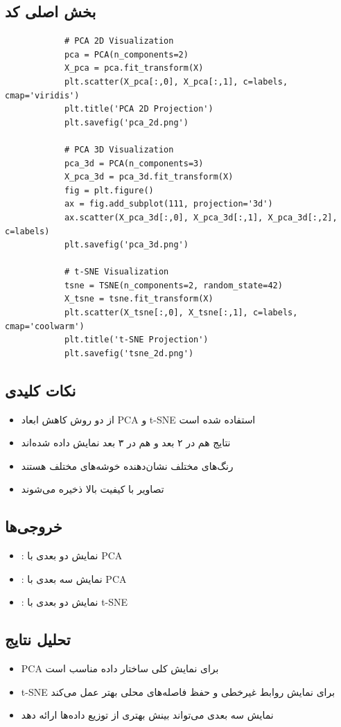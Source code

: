 \documentclass[a4paper,12pt]{article}
\begin{document}
	\subsection{بخش اصلی کد}
	\begin{latin}
		\begin{verbatim}
			# PCA 2D Visualization
			pca = PCA(n_components=2)
			X_pca = pca.fit_transform(X)
			plt.scatter(X_pca[:,0], X_pca[:,1], c=labels, cmap='viridis')
			plt.title('PCA 2D Projection')
			plt.savefig('pca_2d.png')
			
			# PCA 3D Visualization
			pca_3d = PCA(n_components=3)
			X_pca_3d = pca_3d.fit_transform(X)
			fig = plt.figure()
			ax = fig.add_subplot(111, projection='3d')
			ax.scatter(X_pca_3d[:,0], X_pca_3d[:,1], X_pca_3d[:,2], c=labels)
			plt.savefig('pca_3d.png')
			
			# t-SNE Visualization
			tsne = TSNE(n_components=2, random_state=42)
			X_tsne = tsne.fit_transform(X)
			plt.scatter(X_tsne[:,0], X_tsne[:,1], c=labels, cmap='coolwarm')
			plt.title('t-SNE Projection')
			plt.savefig('tsne_2d.png')
		\end{verbatim}
	\end{latin}
	
	\subsection{نکات کلیدی}
	\begin{itemize}
		\item از دو روش کاهش ابعاد PCA و t-SNE استفاده شده است
		\item نتایج هم در ۲ بعد و هم در ۳ بعد نمایش داده شده‌اند
		\item رنگ‌های مختلف نشان‌دهنده خوشه‌های مختلف هستند
		\item تصاویر با کیفیت بالا ذخیره می‌شوند
	\end{itemize}
	
	\subsection{خروجی‌ها}
	\begin{itemize}
		\item {}: نمایش دو بعدی با PCA
		\item {}: نمایش سه بعدی با PCA
		\item {}: نمایش دو بعدی با t-SNE
	\end{itemize}
	
	\subsection{تحلیل نتایج}
	\begin{itemize}
		\item PCA برای نمایش کلی ساختار داده مناسب است
		\item t-SNE برای نمایش روابط غیرخطی و حفظ فاصله‌های محلی بهتر عمل می‌کند
		\item نمایش سه بعدی می‌تواند بینش بهتری از توزیع داده‌ها ارائه دهد
	\end{itemize}
	
\end{document}

